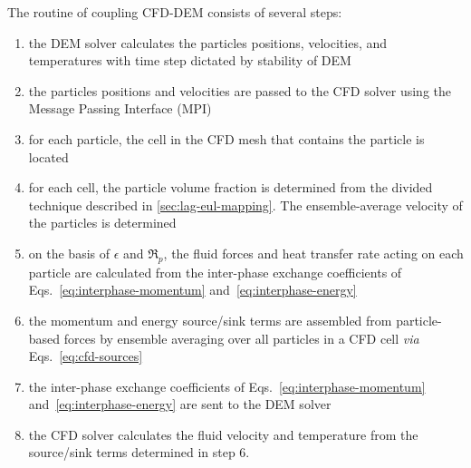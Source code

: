 
The routine of coupling CFD-DEM consists of several steps:
\begin{enumerate}
\item the DEM solver calculates the particles positions, velocities, and temperatures with time step dictated by stability of DEM
\item the particles positions and velocities are passed to the CFD solver using the Message Passing Interface (MPI)
\item for each particle, the cell in the CFD mesh that contains the particle is located
\item for each cell, the particle volume fraction is determined from the divided technique described in \cref{sec:lag-eul-mapping}. The ensemble-average velocity of the particles is determined
\item on the basis of $\epsilon$ and $\Re_p$, the fluid forces and heat transfer rate acting on each particle are calculated from the inter-phase exchange coefficients of Eqs.~\ref{eq:interphase-momentum} and~\ref{eq:interphase-energy}
\item the momentum and energy source/sink terms are assembled from particle-based forces by ensemble averaging over all particles in a CFD cell \textit{via} Eqs.~\ref{eq:cfd-sources}
\item the inter-phase exchange coefficients of Eqs.~\ref{eq:interphase-momentum} and~\ref{eq:interphase-energy} are sent to the DEM solver
\item the CFD solver calculates the fluid velocity and temperature from the source/sink terms determined in step 6.
\end{enumerate}

%
%
